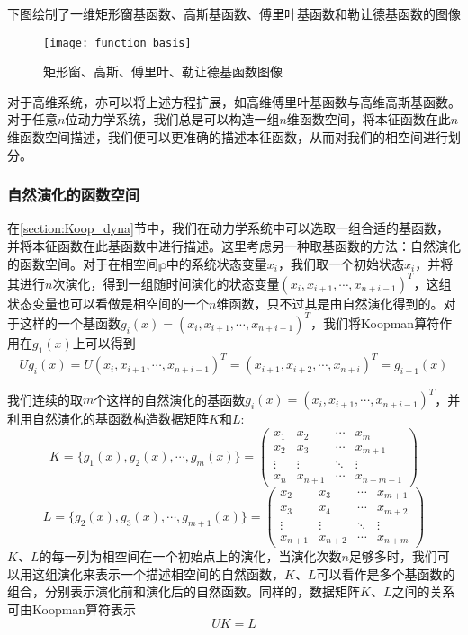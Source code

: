 下图绘制了一维矩形窗基函数、高斯基函数、傅里叶基函数和勒让德基函数的图像
\begin{figure}
	\centering
	\texttt{[image: function\_basis]}
    \caption{矩形窗、高斯、傅里叶、勒让德基函数图像}
    \label{fig:func_bas}
\end{figure}

对于高维系统，亦可以将上述方程扩展，如高维傅里叶基函数与高维高斯基函数。对于任意$n$位动力学系统，我们总是可以构造一组$n$维函数空间，将本征函数在此$n$维函数空间描述，我们便可以更准确的描述本征函数，从而对我们的相空间进行划分。

\subsubsection{自然演化的函数空间}

在\ref{section:Koop_dyna}节中，我们在动力学系统中可以选取一组合适的基函数，并将本征函数在此基函数中进行描述。这里考虑另一种取基函数的方法：自然演化的函数空间。对于在相空间$\mathbb{p}$中的系统状态变量$x_i$，我们取一个初始状态$x_i$，并将其进行$n$次演化，得到一组随时间演化的状态变量$(x_i,x_{i+1},\cdots,x_{n+i-1})^T$，这组状态变量也可以看做是相空间的一个$n$维函数，只不过其是由自然演化得到的。对于这样的一个基函数$g_i(x)=(x_i,x_{i+1},\cdots,x_{n+i-1})^T$，我们将Koopman算符作用在$g_1(x)$上可以得到
\begin{equation}
    Ug_i(x)=U(x_i,x_{i+1},\cdots,x_{n+i-1})^T=(x_{i+1},x_{i+2},\cdots,x_{n+i})^T=g_{i+1}(x)
\end{equation}

我们连续的取$m$个这样的自然演化的基函数$g_i(x)=(x_i,x_{i+1},\cdots,x_{n+i-1})^T$，并利用自然演化的基函数构造数据矩阵$K$和$L$:
\begin{equation}
    K=\{g_1(x),g_2(x),\cdots,g_m(x)\}=
    \begin{pmatrix}
        x_1 & x_2 & \cdots & x_m \\
        x_2 & x_3 & \cdots & x_{m+1} \\
        \vdots         & \vdots         & \ddots & \vdots \\
        x_n & x_{n+1} & \cdots & x_{n+m-1}
    \end{pmatrix}
\end{equation}
\begin{equation}
    L=\{g_2(x),g_3(x),\cdots,g_{m+1}(x)\}=
    \begin{pmatrix}
        x_2 & x_3 & \cdots & x_{m+1} \\
        x_3 & x_4 & \cdots & x_{m+2} \\
        \vdots         & \vdots         & \ddots & \vdots \\
        x_{n+1} & x_{n+2} & \cdots & x_{n+m}
    \end{pmatrix}
\end{equation}
$K$、$L$的每一列为相空间在一个初始点上的演化，当演化次数$n$足够多时，我们可以用这组演化来表示一个描述相空间的自然函数，$K$、$L$可以看作是多个基函数的组合，分别表示演化前和演化后的自然函数。同样的，数据矩阵$K$、$L$之间的关系可由Koopman算符表示
\begin{equation}
    UK=L
    \label{eq:Koop_kl2}
\end{equation}

